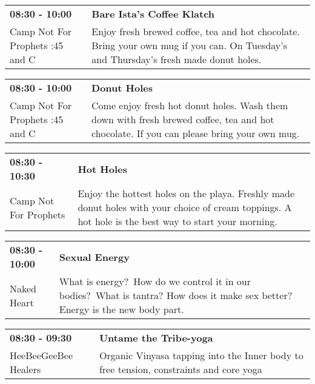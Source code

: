 \begin{tabular}{ p{1in} p{2.2in} }
    \textbf{08:30 - 10:00} & \textbf{Bare Ista's Coffee Klatch } \\
    Camp Not For Prophets \newline 2:45 and C & Enjoy fresh brewed coffee, tea and hot chocolate. Bring your own mug if you can. On Tuesday's and Thursday's fresh made donut holes. \\
    \hline 
\end{tabular}
    
\begin{tabular}{ p{1in} p{2.2in} }
    \textbf{08:30 - 10:00} & \textbf{Donut Holes} \\
    Camp Not For Prophets \newline 2:45 and C & Come enjoy fresh hot donut holes. Wash them down with fresh brewed coffee, tea and hot chocolate. If you can please bring your own mug. \\
    \hline 
\end{tabular}
    
\begin{tabular}{ p{1in} p{2.2in} }
    \textbf{08:30 - 10:30} & \textbf{Hot Holes} \\
    Camp Not For Prophets \newline  & Enjoy the hottest holes on the playa. Freshly made donut holes with your choice of cream toppings.  A hot hole is the best way to start your morning. \\
    \hline 
\end{tabular}
    
\begin{tabular}{ p{1in} p{2.2in} }
    \textbf{08:30 - 10:00} & \textbf{Sexual Energy} \\
    Naked Heart \newline  & What is energy?~How do we control it in our bodies?~What is tantra? How does it make sex better? Energy is the new body part. \\
    \hline 
\end{tabular}
    
\begin{tabular}{ p{1in} p{2.2in} }
    \textbf{08:30 - 09:30} & \textbf{Untame the Tribe-yoga} \\
    HeeBeeGeeBee Healers \newline  & Organic Vinyasa tapping into the Inner body to free tension, constraints and core yoga \\
    \hline 
\end{tabular}
    
